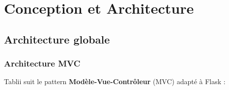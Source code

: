 \documentclass[12pt,a4paper]{report}
\begin{document}
\cleardoublepage

\chapter{Conception et Architecture}

\section{Architecture globale}

\subsection{Architecture MVC}

Tablii suit le pattern \textbf{Modèle-Vue-Contrôleur} (MVC) adapté à Flask :
\end{document}
